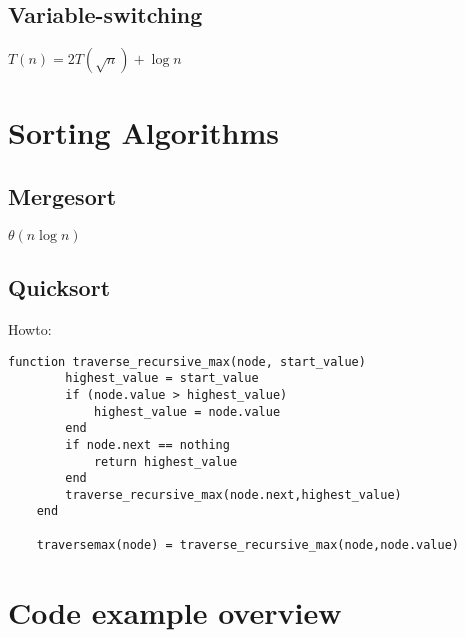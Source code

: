 \documentclass{article}
\begin{document}
\subsection{Variable-switching}
$T(n) = 2T(\sqrt{n})+\log n$


\section{Sorting Algorithms}
\subsection{Mergesort}
$\theta(n \log n)$

\subsection{Quicksort}
Howto:

\begin{lstlisting}[caption=Julia example]
    function traverse_recursive_max(node, start_value)
        highest_value = start_value
        if (node.value > highest_value)
            highest_value = node.value
        end
        if node.next == nothing
            return highest_value
        end
        traverse_recursive_max(node.next,highest_value)
    end
    
    traversemax(node) = traverse_recursive_max(node,node.value)
\end{lstlisting}


\section{Code example overview}
\lstlistoflistings
\end{document}
